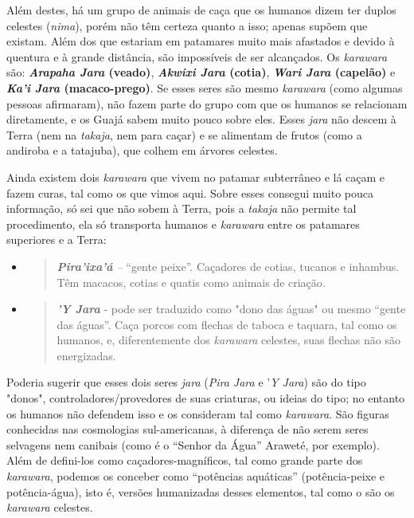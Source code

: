 Além destes, há um grupo de animais de caça que os humanos dizem ter
duplos celestes (\emph{nima}), porém não têm certeza quanto a isso;
apenas supõem que existam. Além dos que estariam em patamares muito mais
afastados e devido à quentura e à grande distância, são impossíveis de
ser alcançados. Os \emph{karawara} são: \textbf{\emph{Arapaha Jara}
(veado)}, \textbf{\emph{Akwixi Jara} (cotia)}, \textbf{\emph{Wari Jara}
(capelão)} e \textbf{\emph{Ka'i Jara} (macaco-prego)}. Se esses seres
são mesmo \emph{karawara} (como algumas pessoas afirmaram), não fazem
parte do grupo com que os humanos se relacionam diretamente, e os Guajá
sabem muito pouco sobre eles. Esses \emph{jara} não descem à Terra (nem
na \emph{takaja}, nem para caçar) e se alimentam de frutos (como a
andiroba e a tatajuba), que colhem em árvores celestes.

Ainda existem dois \emph{karawara} que vivem no patamar subterrâneo e lá
caçam e fazem curas, tal como os que vimos aqui. Sobre esses consegui
muito pouca informação, só sei que não sobem à Terra, pois a
\emph{takaja} não permite tal procedimento, ela só transporta humanos e
\emph{karawara} entre os patamares superiores e a Terra:

\begin{itemize}
\item
  \begin{quote}
  \emph{\textbf{Pira'ixa'á} --} ``gente peixe''. Caçadores de cotias,
  tucanos e inhambus. Têm macacos, cotias e quatis como animais de
  criação\emph{. }
  \end{quote}
\item
  \begin{quote}
  \emph{\textbf{'Y Jara}} - pode ser traduzido como "dono das águas" ou
  mesmo ``gente das águas''. Caça porcos com flechas de taboca e
  taquara, tal como os humanos, e, diferentemente dos \emph{karawara}
  celestes, suas flechas não são energizadas.
  \end{quote}
\end{itemize}

Poderia sugerir que esses dois seres \emph{jara} (\emph{Pira Jara} e
'\emph{Y Jara}) são do tipo "donos", controladores/provedores de suas
criaturas, ou ideias do tipo; no entanto os humanos não defendem isso e
os consideram tal como \emph{karawara}. São figuras conhecidas nas
cosmologias sul-americanas, à diferença de não serem seres selvagens nem
canibais (como é o ``Senhor da Água'' Araweté, por exemplo). Além de
defini-los como caçadores-magníficos, tal como grande parte dos
\emph{karawara}, podemos os conceber como ``potências aquáticas''
(potência-peixe e potência-água), isto é, versões humanizadas desses
elementos, tal como o são os \emph{karawara} celestes.

